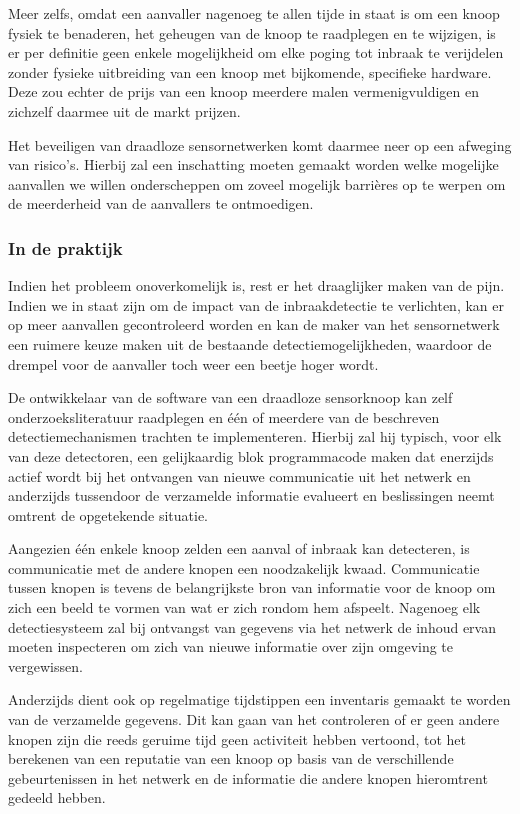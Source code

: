 \documentclass[DIV=calc,paper=a4,fontsize=11pt,twocolumn,draft]{scrartcl}
\newcommand{\heading}[1]{
\subsubsection*{#1}
\vspace{-2mm}
}
\begin{document}
Meer zelfs, omdat een aanvaller nagenoeg te allen tijde in staat is om een
knoop fysiek te benaderen, het geheugen van de knoop te raadplegen en te
wijzigen, is er per definitie geen enkele mogelijkheid om elke poging tot
inbraak te verijdelen zonder fysieke uitbreiding van een knoop met bijkomende,
specifieke hardware. Deze zou echter de prijs van een knoop meerdere malen
vermenigvuldigen en zichzelf daarmee uit de markt prijzen.

Het beveiligen van draadloze sensornetwerken komt daarmee neer op een afweging
van risico's. Hierbij zal een inschatting moeten gemaakt worden welke mogelijke
aanvallen we willen onderscheppen om zoveel mogelijk barri\`eres op te werpen
om de meerderheid van de aanvallers te ontmoedigen.

\heading{In de praktijk}

Indien het probleem onoverkomelijk is, rest er het draaglijker maken van de
pijn. Indien we in staat zijn om de impact van de inbraakdetectie te
verlichten, kan er op meer aanvallen gecontroleerd worden en kan de maker van
het sensornetwerk een ruimere keuze maken uit de bestaande
detectiemogelijkheden, waardoor de drempel voor de aanvaller toch weer een
beetje hoger wordt.

De ontwikkelaar van de software van een draadloze sensorknoop kan zelf
onderzoeksliteratuur raadplegen en \'e\'en of meerdere van de beschreven
detectiemechanismen trachten te implementeren. Hierbij zal hij typisch, voor
elk van deze detectoren, een gelijkaardig blok programmacode maken dat
enerzijds actief wordt bij het ontvangen van nieuwe communicatie uit het
netwerk en anderzijds tussendoor de verzamelde informatie evalueert en
beslissingen neemt omtrent de opgetekende situatie.

Aangezien \'e\'en enkele knoop zelden een aanval of inbraak kan detecteren, is
communicatie met de andere knopen een noodzakelijk kwaad. Communicatie tussen
knopen is tevens de belangrijkste bron van informatie voor de knoop om zich een
beeld te vormen van wat er zich rondom hem afspeelt. Nagenoeg elk
detectiesysteem zal bij ontvangst van gegevens via het netwerk de inhoud ervan
moeten inspecteren om zich van nieuwe informatie over zijn omgeving te
vergewissen.

Anderzijds dient ook op regelmatige tijdstippen een inventaris gemaakt te
worden van de verzamelde gegevens. Dit kan gaan van het controleren of er geen
andere knopen zijn die reeds geruime tijd geen activiteit hebben vertoond, tot
het berekenen van een reputatie van een knoop op basis van de verschillende
gebeurtenissen in het netwerk en de informatie die andere knopen hieromtrent
gedeeld hebben.
\end{document}
